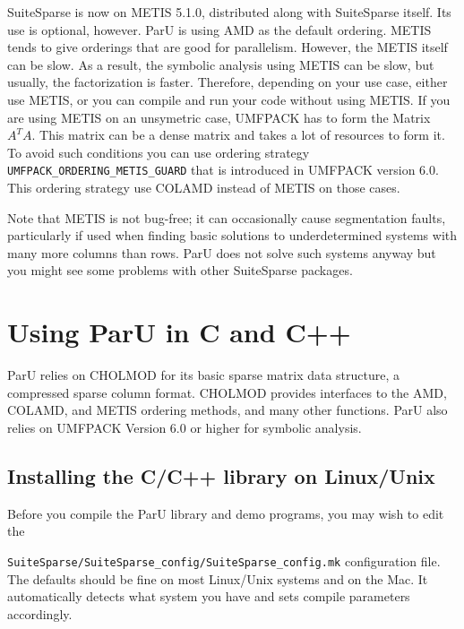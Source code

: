 \documentclass[12pt]{article}
\begin{document}
SuiteSparse is now on METIS 5.1.0, distributed along with SuiteSparse itself.
Its use is optional, however. ParU is using AMD as the default ordering. METIS
tends to give orderings that are good for parallelism. However, the METIS itself
can be slow. As a result, the symbolic analysis using METIS can be slow, but
usually, the factorization is faster. Therefore, depending on your use case,
either use METIS, or you can compile and run your code without using METIS.
If you are using METIS on an unsymetric case, UMFPACK has to form the Matrix
$A^{T}A$. This matrix can be a dense matrix and takes a lot of resources to form
it. To avoid such conditions you can use ordering strategy
\verb'UMFPACK_ORDERING_METIS_GUARD' that is introduced in UMFPACK version 6.0.
This ordering strategy use COLAMD instead of METIS on those cases.

Note that METIS is not bug-free; it can occasionally cause segmentation 
faults, particularly if used when finding basic solutions to underdetermined 
systems with many more columns than rows. ParU does not solve such 
systems anyway but you might see some problems with other SuiteSparse packages.

\section{Using ParU in C and C++}

ParU relies on CHOLMOD for its basic sparse matrix data structure, a compressed 
sparse column format.  CHOLMOD provides interfaces to the AMD, COLAMD, and METIS
ordering methods, and many other functions. ParU also relies on UMFPACK Version 
6.0 or higher for symbolic analysis. 


\subsection{Installing the C/C++ library on Linux/Unix}

Before you compile the ParU library and demo programs, you may wish to
edit the 

\verb'SuiteSparse/SuiteSparse_config/SuiteSparse_config.mk' 
configuration file.  The defaults should be fine on most Linux/Unix systems and 
on the Mac.
It automatically detects what system you have and sets compile parameters
accordingly.
\end{document}
